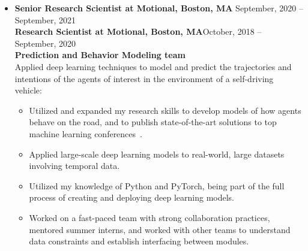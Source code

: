 \documentclass[10pt,letterpaper]{article}
\newcommand{\thing}[2]{{#1} \hfill {#2}}
\begin{document}
\begin{itemize}
\item \thing{\bf Senior Research Scientist at Motional, Boston, MA}{September, 2020 -- September, 2021}\\
 	{\bf Research Scientist at Motional, Boston, MA}\hfill{October, 2018  --  September, 2020}\vspace{0.5em}\\
	{\bf Prediction and Behavior Modeling team}\vspace{0.5em}\\
      	Applied deep learning techniques to model and predict the trajectories and intentions of the agents of interest in the environment of a self-driving vehicle:  %
	\begin{itemize} \itemsep0em
	\vspace{-0.5em}
		\item Utilized and expanded my research skills to develop models of how agents behave on the road, and to publish state-of-the-art solutions to top machine learning conferences~\cite{grigore2020covernet}. 
		\item Applied large-scale deep learning models to real-world, large datasets involving temporal data. 
		\item Utilized my knowledge of Python and PyTorch, being part of the full process of creating and deploying deep learning models. 
		\item Worked on a fast-paced team with strong collaboration practices, mentored summer interns, and worked with other teams to understand data constraints and establish interfacing between modules.
	\end{itemize}
		
	

\end{itemize}
\end{document}
